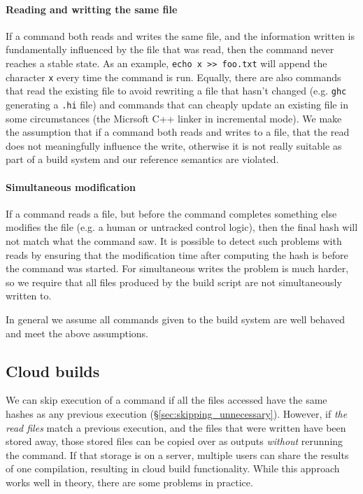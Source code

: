 \paragraph{Reading and writting the same file} If a command both reads and writes the same file, and the information written is fundamentally influenced by the file that was read, then the command never reaches a stable state. As an example, \verb"echo x >> foo.txt" will append the character \texttt{x} every time the command is run. Equally, there are also commands that read the existing file to avoid rewriting a file that hasn't changed (e.g. \texttt{ghc} generating a \texttt{.hi} file) and commands that can cheaply update an existing file in some circumstances (the Micrsoft C++ linker in incremental mode). We make the assumption that if a command both reads and writes to a file, that the read does not meaningfully influence the write, otherwise it is not really suitable as part of a build system and our reference semantics are violated.

\paragraph{Simultaneous modification} If a command reads a file, but before the command completes something else modifies the file (e.g. a human or untracked control logic), then the final hash will not match what the command saw. It is possible to detect such problems with reads by ensuring that the modification time after computing the hash is before the command was started. For simultaneous writes the problem is much harder, so we require that all files produced by the build script are not simultaneously written to.

\postparagrahs In general we assume all commands given to the build system are well behaved and meet the above assumptions.

\subsection{Cloud builds}
\label{sec:cloud_builds}

We can skip execution of a command if all the files accessed have the same hashes as any previous execution (\S\ref{sec:skipping_unnecessary}). However, if \emph{the read files} match a previous execution, and the files that were written have been stored away, those stored files can be copied over as outputs \emph{without} rerunning the command. If that storage is on a server, multiple users can share the results of one compilation, resulting in cloud build functionality. While this approach works well in theory, there are some problems in practice.

